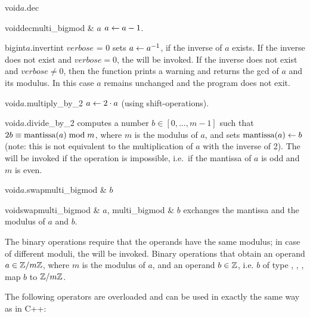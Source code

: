 \begin{fcode}{void}{$a$.dec}{}\end{fcode}
\begin{fcode}{void}{dec}{multi_bigmod & $a$}
  $a \leftarrow a - 1$.
\end{fcode}

\begin{fcode}{bigint}{$a$.invert}{int $\mathit{verbose}$ = 0}
  sets $a \leftarrow a^{-1}$, if the inverse of $a$ exists.  If the inverse does not exist and
  $\mathit{verbose} = 0$, the \LEH will be invoked.  If the inverse does not exist and
  $\mathit{verbose} \neq 0$, then the function prints a warning and returns the gcd of $a$ and
  its modulus.  In this case $a$ remains unchanged and the program does not exit.
\end{fcode}

\begin{fcode}{void}{$a$.multiply_by_2}{}
  $a \leftarrow 2 \cdot a$ (using shift-operations).
\end{fcode}

\begin{fcode}{void}{$a$.divide_by_2}{}
  computes a number $b\in [0, \dots, m-1]$ such that $2 b\equiv \operatorname{mantissa}(a)\bmod m$, where $m$
  is the modulus of $a$, and sets $\operatorname{mantissa}(a) \leftarrow b$ (note: this is not equivalent to the
  multiplication of $a$ with the inverse of 2).  The \LEH will be invoked if the
  operation is impossible, i.e.~if the mantissa of $a$ is odd and $m$ is even.
\end{fcode}

\begin{fcode}{void}{$a$.swap}{multi_bigmod & $b$}\end{fcode}
\begin{fcode}{void}{swap}{multi_bigmod & $a$, multi_bigmod & $b$}
  exchanges the mantissa and the modulus of $a$ and $b$.
\end{fcode}




\ARTH

The binary operations require that the operands have the same modulus; in case of different
moduli, the \LEH will be invoked.  Binary operations that obtain an operand $a \in \mathbb{Z}/m\mathbb{Z}$, where
$m$ is the modulus of $a$, and an operand $b \in \mathbb{Z}$, i.e. $b$ of type ,
, , map $b$ to $\mathbb{Z}/m\mathbb{Z}$.

The following operators are overloaded and can be used in exactly the same way as in C++:

